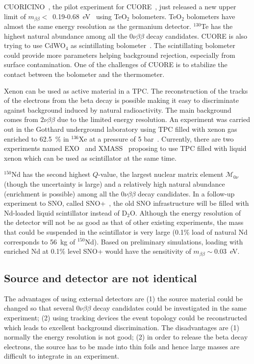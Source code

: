 CUORICINO~\cite{Pre04}, the pilot experiment for CUORE~\cite{Arn04, Ard05}, just released a new upper limit of $m_{\beta\beta} <$~0.19-0.68~eV~\cite{Arn08} using TeO$_{2}$ bolometers. TeO$_{2}$ bolometers have almost the same energy resolution as the germanium detector. $^{130}$Te has the highest natural abundance among all the $0\nu\beta\beta$ decay candidates. CUORE is also trying to use CdWO$_{4}$ as scintillating bolometer~\cite{Gir08}. The scintillating bolometer could provide more parameters helping background rejection, especially from surface contamination. One of the challenges of CUORE is to stabilize the contact between the bolometer and the thermometer.

Xenon can be used as active material in a TPC. The reconstruction of the tracks of the electrons from the beta decay is possible making it easy to discriminate against background induced by natural radioactivity. The main background comes from $2\nu\beta\beta$ due to the limited energy resolution. An experiment was carried out in the Gotthard underground laboratory using TPC filled with xenon gas enriched to 62.5~\% in $^{136}$Xe at a pressure of 5 bar~\cite{Lue98}. Currently, there are two experiments named EXO~\cite{Dan00} and XMASS~\cite{Kim05} proposing to use TPC filled with liquid xenon which can be used as scintillator at the same time.

$^{150}$Nd has the second highest $Q$-value, the largest nuclear matrix element $\mathcal{M}_{0\nu}$ (though the uncertainty is large) and a relatively high natural abundance (enrichment is possible) among all the $0\nu\beta\beta$ decay candidates. In a follow-up experiment to SNO, called SNO+~\cite{Zub07}, the old SNO infrastructure will be filled with Nd-loaded liquid scintillator instead of D$_{2}$O. Although the energy resolution of the detector will not be as good as that of other existing experiments, the mass that could be suspended in the scintillator is very large (0.1\% load of natural Nd corresponds to 56~kg of $^{150}$Nd). Based on preliminary simulations, loading with enriched Nd at 0.1\% level SNO+ would have the sensitivity of $m_{\beta\beta} \sim 0.03$~eV.

\subsection{Source and  detector are not identical}
\label{sec:exp:sued}
The advantages of using external detectors are (1) the source material could be changed so that several $0\nu\beta\beta$ decay candidates could be investigated in the same experiment; (2) using tracking devices the event topology could be reconstructed which leads to excellent background discrimination. The disadvantages are (1) normally the energy resolution is not good; (2) in order to release the beta decay electrons, the source has to be made into thin foils and hence large masses are difficult to integrate in an experiment.

